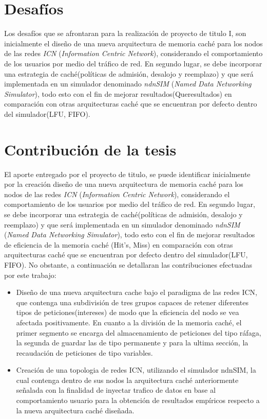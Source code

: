 \documentclass[12pt]{ociamthesis}  %
\begin{document}
\section{Desafíos}
Los desafíos que se afrontaran para la realización de proyecto de titulo I, son inicialmente el diseño de una nueva arquitectura de memoria caché para los nodos de las redes \textit{ICN} (\textit{Information Centric Network}), considerando el comportamiento de los usuarios por medio del tráfico de red. En segundo lugar, se debe incorporar una estrategia de caché(políticas de admisión, desalojo y reemplazo) y que será implementada en un simulador denominado \textit{ndnSIM} (\textit{Named Data Networking Simulator}), todo esto con el fin de mejorar resultados(Queresultados) en comparación con otras arquitecturas caché que se encuentran por defecto dentro del simulador(LFU, FIFO).\\

\section{Contribución de la tesis}
El aporte entregado por el proyecto de titulo, se puede identificar inicialmente por la creación diseño de una nueva arquitectura de memoria caché para los nodos de las redes \textit{ICN} (\textit{Information Centric Network}), considerando el comportamiento de los usuarios por medio del tráfico de red. En segundo lugar, se debe incorporar una estrategia de caché(políticas de admisión, desalojo y reemplazo) y que será implementada en un simulador denominado \textit{ndnSIM} (\textit{Named Data Networking Simulator}), todo esto con el fin de mejorar resultados de eficiencia de la memoria caché (Hit's, Miss) en comparación con otras arquitecturas caché que se encuentran por defecto dentro del simulador(LFU, FIFO). No obstante, a continuación se detallaran las contribuciones efectuadas por este trabajo:\\
\begin{itemize}
	\item Diseño de una nueva arquitectura cache bajo el paradigma de las redes ICN, que contenga una subdivisión de tres grupos capaces de retener diferentes tipos de peticiones(intereses) de modo que la eficiencia del nodo se vea afectada positivamente. En cuanto a la división de la memoria caché, el primer segmento se encarga del almacenamiento de peticiones del tipo ráfaga, la segunda de guardar las de tipo permanente y para la ultima sección, la recaudación de peticiones de tipo variables.\\
	\item Creación de una topologia de redes ICN, utilizando el simulador ndnSIM, la cual contenga dentro de sus nodos la arquitectura caché anteriormente señalada con la finalidad de inyectar trafico de datos en base al comportamiento usuario para la obtención de resultados empíricos respecto a la nueva arquitectura caché diseñada.\\
\end{itemize}
\end{document}
